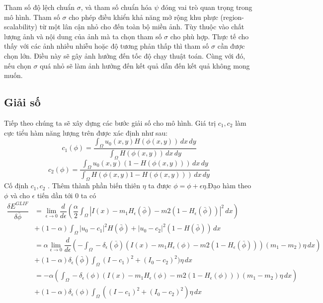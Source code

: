 \documentclass[12pt,oneside,a4]{report}
\begin{document}
Tham số độ lệch chuẩn $\sigma$, và tham số chuẩn hóa $\psi$ đóng vai trò quan trọng trong mô hình.  Tham số $\sigma$ cho phép điều khiển khả năng mở rộng khu phực (region-scalability) từ một lân cận nhỏ cho đến toàn bộ miền ảnh. Tùy thuộc vào chất lượng ảnh và nội dung của ảnh mà ta chọn tham số $\sigma$ cho phù hợp. Thực tế cho thấy với các ảnh nhiều nhiễu hoặc độ tương phản thấp thì tham số $\sigma$ cần được chọn lớn. Điều này sẽ gây  ảnh hưởng đến tốc độ chạy thuật toán. Cùng với đó, nếu chọn $\sigma$ quá nhỏ sẽ làm ảnh hưởng đến kết quả dẫn đến kết quả không mong muốn.
\subsection{Giải số}
Tiếp theo chúng ta sẽ xây dựng các bước giải số cho mô hình. Giá trị $c_1, c_2$ làm cực tiểu hàm năng lượng trên được xác định như sau:
\begin{equation}
c_1(\phi)=\dfrac{\int_{\Omega}u_0(x,y)H(\phi(x,y))\,dx \,dy}{\int_{\Omega}H(\phi(x,y))\,dx\,dy}
\end{equation}
\begin{equation}
c_2(\phi)=\dfrac{\int_{\Omega}u_0(x,y)(1-H(\phi(x,y)))\,dx \,dy}{\int_{\Omega}H(\phi(x,y)1-H(\phi(x,y)))\,dx\,dy}
\end{equation}
Cố định $c_1, c_2$ . Thêm thành phần biến thiên $\eta$ ta được $\phi=\phi+\epsilon\eta$.Đạo hàm theo $\phi$ và cho $\epsilon$ tiến dần tới 0 ta có
\begin{equation}
\begin{split}
\dfrac{\delta E^{GLIF}}{\delta\bar{\phi} } &=\lim_{\epsilon \rightarrow 0}\dfrac{d}{d \epsilon}(\dfrac{\alpha}{2}\int_{\Omega}|I(x)-m_1H_{\epsilon}(\bar{\phi})-m2(1-H_{\epsilon}(\bar{\phi}))|^2\,dx) \\ 
&+(1-\alpha) \int_{\Omega} |u_0-c_1|^2H(\bar{\phi})+ |u_0-c_2|^2(1-H(\bar{\phi})) \,dx\\
&=\alpha\lim_{\epsilon \rightarrow 0}\dfrac{d}{d \epsilon}(-\int_{\Omega}-\delta_{\epsilon}(\bar{\phi})(I(x)-m_1H_{\epsilon}(\phi)-m2(1-H_{\epsilon}(\bar{\phi})))(m_1-m_2)\eta\,dx) \\ 
&+(1-\alpha)\delta_{\epsilon}(\bar{\phi})\int_{\Omega} (I-c_1)^2+ (I_0-c_2)^2)\eta \,dx\\
&=-\alpha(\int_{\Omega}-\delta_{\epsilon}(\phi)(I(x)-m_1 H_{\epsilon}(\phi)-m2(1-H_{\epsilon}(\phi)))(m_1-m_2)\eta\,dx)\\
&+(1-\alpha)\delta_{\epsilon}(\phi)\int_{\Omega} ((I-c_1)^2+ (I_0-c_2)^2)\eta \,dx
\end{split}
\end{equation}
\end{document}
